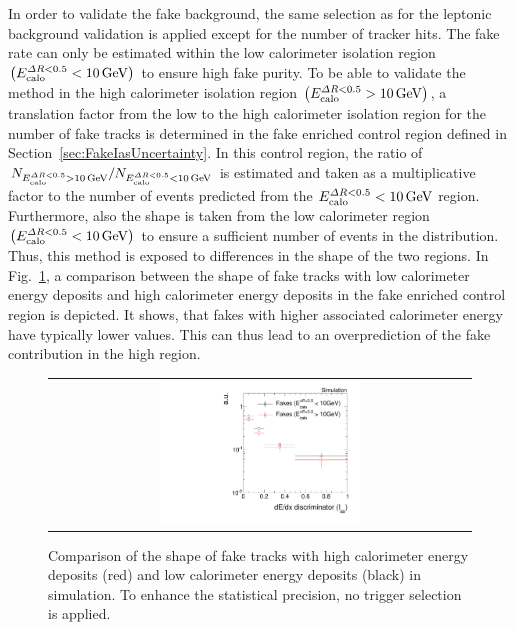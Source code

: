 In order to validate the fake background, the same selection as for the leptonic background validation is applied except for the number of tracker hits.
The fake rate can only be estimated within the low calorimeter isolation region $\left(E^{\Delta R<0.5}_{\text{calo}}<10\,\text{Ge}\kern-0.06667em\text{V}\right)$ to ensure high fake purity.
To be able to validate the method in the high calorimeter isolation region $\left(E^{\Delta R<0.5}_{\text{calo}}>10\,\text{Ge}\kern-0.06667em\text{V}\right)$, a translation factor from the low to the high calorimeter isolation region for the number of fake tracks is determined in the fake enriched control region \fakeCR defined in Section~\ref{sec:FakeIasUncertainty}.
In this control region, the ratio of $N_{E^{\Delta R<0.5}_{\text{calo}}>10\,\text{Ge}\kern-0.06667em\text{V}}/N_{E^{\Delta R<0.5}_{\text{calo}}<10\,\text{Ge}\kern-0.06667em\text{V}}$ is estimated and taken as a multiplicative factor to the number of events predicted from the $E^{\Delta R<0.5}_{\text{calo}}<10\,\text{Ge}\kern-0.06667em\text{V}$ region.
Furthermore, also the \ias shape is taken from the low calorimeter region $\left(E^{\Delta R<0.5}_{\text{calo}}<10\,\text{Ge}\kern-0.06667em\text{V}\right)$ to ensure a sufficient number of events in the \ias distribution. 
Thus, this method is exposed to differences in the \ias shape of the two \ecalo regions.
In Fig.~\ref{fig:IasValidate}, a comparison between the \ias shape of fake tracks with low calorimeter energy deposits and high calorimeter energy deposits in the fake enriched control region is depicted.
It shows, that fakes with higher associated calorimeter energy have typically lower \ias values. 
This can thus lead to an overprediction of the fake contribution in the high \ecalo region.
\begin{figure}[!b]
  \centering 
  \begin{tabular}{c}
    \includegraphics[width=0.49\textwidth]{figures/analysis/Background/IasForFakes_chiTrackspreselectionNoTrigger.pdf}
  \end{tabular}
  \caption{Comparison of the \ias shape of fake tracks with high calorimeter energy deposits (red) and low calorimeter energy deposits (black) in simulation.
           To enhance the statistical precision, no trigger selection is applied.}
  \label{fig:IasValidate}
\end{figure}
